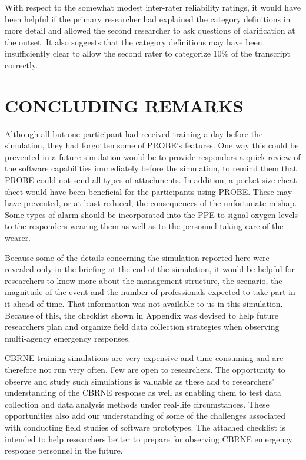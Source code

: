 \documentclass[link]{IWCOMP}
\begin{document}
With respect to the somewhat modest inter-rater reliability ratings, it would
have been helpful if the primary researcher had explained the category
definitions in more detail and allowed the second researcher to ask
questions of clarification at the outset. It also suggests that the category
definitions may have been insufficiently clear to allow the second rater to
categorize 10{\%} of the transcript correctly.

\section{CONCLUDING REMARKS}\label{sec6}

 Although all but one participant had received training a day before the
simulation, they had forgotten some of PROBE's features. One way this could
be prevented in a future simulation would be to provide responders a quick
review of the software capabilities immediately before the simulation, to
remind them that PROBE could not send all types of attachments. In addition,
a pocket-size cheat sheet would have been beneficial for the participants
using PROBE. These may have prevented, or at least reduced, the consequences
of the unfortunate mishap. Some types of alarm should be incorporated into
the PPE to signal oxygen levels to the responders wearing them as well as to
the personnel taking care of the wearer.

Because some of the details concerning the simulation reported here were
revealed only in the briefing at the end of the simulation, it would be
helpful for researchers to know more about the management structure, the
scenario, the magnitude of the event and the number of professionals
expected to take part in it ahead of time. That information was not
available to us in this simulation. Because of this, the checklist shown in
Appendix was devised to help future researchers plan and organize field data
collection strategies when observing multi-agency emergency responses.

CBRNE training simulations are very expensive and time-consuming and are
therefore not run very often. Few are open to researchers. The opportunity
to observe and study such simulations is valuable as these add to
researchers' understanding of the CBRNE response as well as enabling them to
test data collection and data analysis methods under real-life
circumstances. These opportunities also add our understanding of some of the
challenges associated with conducting field studies of software prototypes.
The attached checklist is intended to help researchers better to prepare for
observing CBRNE emergency response personnel in the future.
\end{document}
